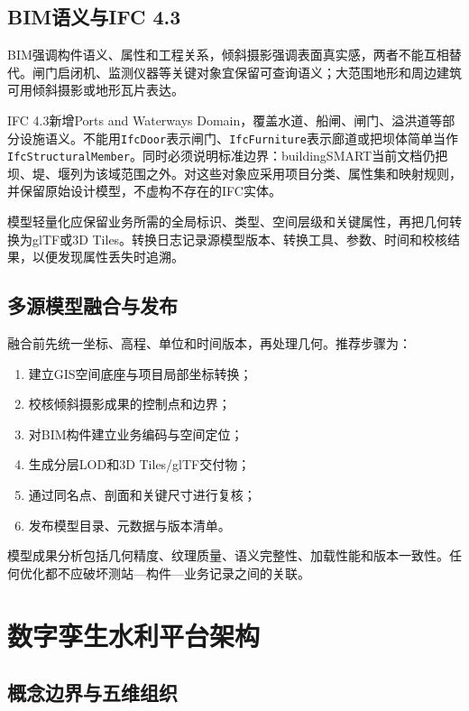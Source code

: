 \subsection{BIM语义与IFC 4.3}

BIM强调构件语义、属性和工程关系，倾斜摄影强调表面真实感，两者不能互相替代。闸门启闭机、监测仪器等关键对象宜保留可查询语义；大范围地形和周边建筑可用倾斜摄影或地形瓦片表达。

IFC 4.3新增Ports and Waterways Domain，覆盖水道、船闸、闸门、溢洪道等部分设施语义\cite{ifc43Ports}。不能用\texttt{IfcDoor}表示闸门、\texttt{IfcFurniture}表示廊道或把坝体简单当作\texttt{IfcStructuralMember}。同时必须说明标准边界：buildingSMART当前文档仍把坝、堤、堰列为该域范围之外。对这些对象应采用项目分类、属性集和映射规则，并保留原始设计模型，不虚构不存在的IFC实体。

模型轻量化应保留业务所需的全局标识、类型、空间层级和关键属性，再把几何转换为glTF或3D Tiles。转换日志记录源模型版本、转换工具、参数、时间和校核结果，以便发现属性丢失时追溯。

\subsection{多源模型融合与发布}

融合前先统一坐标、高程、单位和时间版本，再处理几何。推荐步骤为：
\begin{enumerate}
\item 建立GIS空间底座与项目局部坐标转换；
\item 校核倾斜摄影成果的控制点和边界；
\item 对BIM构件建立业务编码与空间定位；
\item 生成分层LOD和3D Tiles/glTF交付物；
\item 通过同名点、剖面和关键尺寸进行复核；
\item 发布模型目录、元数据与版本清单。
\end{enumerate}

模型成果分析包括几何精度、纹理质量、语义完整性、加载性能和版本一致性。任何优化都不应破坏测站—构件—业务记录之间的关联。

\section{数字孪生水利平台架构}

\subsection{概念边界与五维组织}

